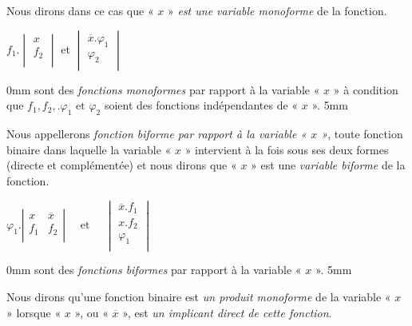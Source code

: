 Nous dirons dans ce cas que « $x$ » \textsl {est une variable monoforme} de la fonction.


 \bigskip 
 
 \centerline{ $f_1 .  \begin{vmatrix} x \\ f_2 \\
                               \end{vmatrix}$   et  $ 
                               \begin{vmatrix} \overline{x} . {\varphi}_1 \\  {\varphi}_2 \\
                               \end{vmatrix}$  }
 
 \bigskip 
  
\setlength {\parindent} {0mm}  
sont des \textsl{fonctions monoformes} par rapport à la variable « $x$ » à condition que $f_1, f_2, . {\varphi}_1 \text{ et } {\varphi}_2 $ soient des fonctions indépendantes de  « $x$ ». 
\setlength {\parindent} {5mm}

Nous appellerons \textsl{fonction biforme par rapport à la variable « $x$ »}, toute fonction binaire dans laquelle la variable « $x$ » intervient à la fois sous ses deux formes (directe et complémentée) et nous dirons que « $x$ » est une \textsl{variable biforme} de la fonction.  


 \bigskip 

 \centerline{ $ {\varphi}_1 .   \left| \begin{array}{c|c} x  & \overline{x}\\ f_1 & f_2 \\
\end{array} \right| \quad \text{ et } \quad 
                               \begin{vmatrix} \overline{x} . f_1 \\
                               x . f_2 \\
                                  {\varphi}_1 \\
                               \end{vmatrix}$  }
 
 \bigskip 
 
\setlength {\parindent} {0mm}  
sont des \textsl{fonctions biformes} par rapport à la variable « $x$ ».
\setlength {\parindent} {5mm} 


Nous dirons qu'une fonction binaire est \textsl{un produit monoforme} de la variable « $x$ » lorsque « $x$ », ou « $\overline{x}$ », est \textsl{un implicant direct de cette fonction}. 

